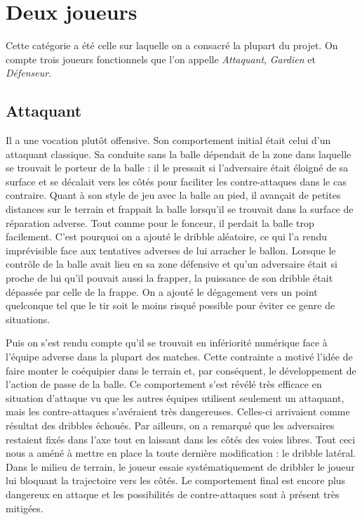\documentclass[12pt,a4paper]{article}
\begin{document}
\section{Deux joueurs}
Cette cat\'egorie a \'et\'e celle sur laquelle on a consacr\'e la plupart du 
projet. On compte trois joueurs fonctionnels que l'on appelle 
{\itshape Attaquant}, {\itshape Gardien} et {\itshape D\'efenseur}. 

\subsection*{Attaquant}
Il a une vocation plut\^ot offensive. Son comportement initial \'etait celui 
d'un attaquant classique. 
Sa conduite sans la balle d\'ependait de la zone dans laquelle se trouvait le 
porteur de la balle : il le pressait si l'adversaire \'etait \'eloign\'e de sa 
surface et se d\'ecalait vers les c\^ot\'es pour faciliter les contre-attaques 
dans le cas contraire. 
Quant \`a son style de jeu avec la balle au pied, il avan\c{c}ait de petites 
distances sur le terrain et frappait la balle lorsqu'il se trouvait dans la 
surface de r\'eparation adverse. Tout comme pour le fonceur, il perdait la balle 
trop facilement. 
C'est pourquoi on a ajout\'e le dribble al\'eatoire, ce qui l'a rendu 
impr\'evisible face aux tentatives adverses de lui arracher le ballon. 
Lorsque le contr\^ole de la balle avait lieu en sa zone d\'efensive et qu'un 
adversaire \'etait si proche de lui qu'il pouvait aussi la frapper, la 
puissance de son dribble \'etait d\'epass\'ee par celle de la frappe. On a 
ajout\'e le d\'egagement vers un point quelconque tel que le tir soit le moins 
risqu\'e possible pour \'eviter ce genre de situations.

Puis on s'est rendu compte qu'il se trouvait en inf\'eriorit\'e num\'erique face 
\`a l'\'equipe adverse dans la plupart des matches. Cette contrainte a motiv\'e 
l'id\'ee de faire monter le co\'equipier dans le terrain et, par cons\'equent, 
le d\'eveloppement de l'action de passe de la balle.
Ce comportement s'est r\'ev\'el\'e tr\`es efficace en situation d'attaque vu 
que les autres \'equipes utilisent seulement un attaquant, mais les 
contre-attaques s'av\'eraient tr\`es dangereuses. Celles-ci arrivaient comme 
r\'esultat des dribbles \'echou\'es. Par ailleurs, on a remarqu\'e que les 
adversaires restaient fix\'es dans l'axe tout en laissant dans les c\^ot\'es 
des voies libres. Tout ceci nous a am\'en\'e \`a mettre en place la toute 
derni\`ere modification : le dribble lat\'eral. Dans le milieu de terrain, le 
joueur essaie syst\'ematiquement de dribbler le joueur lui bloquant la 
trajectoire vers les c\^ot\'es. Le comportement final est encore plus 
dangereux en attaque et les possibilit\'es de contre-attaques sont \`a 
pr\'esent tr\`es mitig\'ees.
\end{document}
